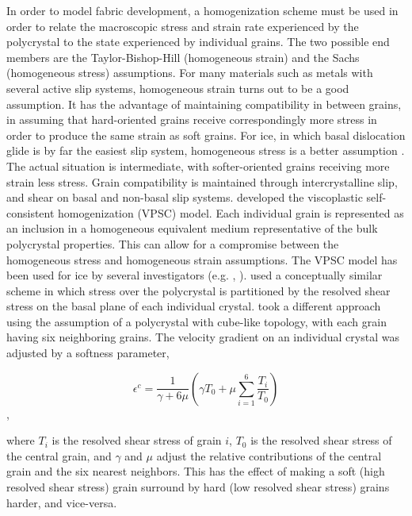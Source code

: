 \documentclass{igs}
\begin{document}
In order to model fabric development, a homogenization scheme must be used in order to relate the macroscopic stress and strain rate experienced by the polycrystal to the state experienced by individual grains. The two possible end members are the Taylor-Bishop-Hill (homogeneous strain) \citep{taylor} and the Sachs (homogeneous stress) \citep{sachs} assumptions. For many materials such as metals with several active slip systems, homogeneous strain turns out to be a good assumption. It has the advantage of maintaining compatibility in between grains, in assuming that hard-oriented grains receive correspondingly more stress in order to produce the same strain as soft grains. For ice, in which basal dislocation glide is by far the easiest slip system, homogeneous stress is a better assumption \citep{thorsteinsson2002nni}. The actual situation is intermediate, with softer-oriented grains receiving more strain less stress. Grain compatibility is maintained through intercrystalline slip, and shear on basal and non-basal slip systems. \citet{molinari} developed the viscoplastic self-consistent homogenization (VPSC) model. Each individual grain is represented as an inclusion in a homogeneous equivalent medium representative of the bulk polycrystal properties. This can allow for a compromise between the homogeneous stress and homogeneous strain assumptions. The VPSC model has been used for ice by several investigators (e.g. \citet{gillet2005}, \citet{castelnau1997}). \citet{azuma96} used a conceptually similar scheme in which stress over the polycrystal is partitioned by the resolved shear stress on the basal plane of each individual crystal. \citet{thorsteinsson2002nni} took a different approach using the assumption of a polycrystal with cube-like topology, with each grain having six neighboring grains. The velocity gradient on an individual crystal was adjusted by a softness parameter,

\begin{equation}
\epsilon^c = \frac {1}{\gamma + 6 \mu} \left( \gamma T_0 + \mu \sum_{i=1}^6 \frac{T_i}{T_0} \right)
\end{equation},

where $T_i$ is the resolved shear stress of grain $i$, $T_0$ is the resolved shear stress of the central grain, and $\gamma$ and $\mu$ adjust the relative contributions of the central grain and the six nearest neighbors. This has the effect of making a soft (high resolved shear stress) grain surround by hard (low resolved shear stress) grains harder, and vice-versa.
\end{document}
